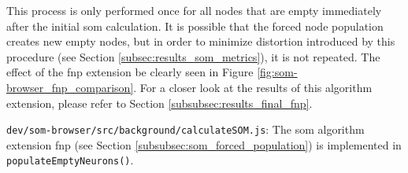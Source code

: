 This process is only performed once for all nodes that are empty immediately
after the initial \gls{som} calculation. It is possible that the forced node
population creates new empty nodes, but in order to minimize distortion
introduced by this procedure (see Section \ref{subsec:results_som_metrics}), it
is not repeated. The effect of the \gls{fnp} extension be clearly seen in Figure
\ref{fig:som-browser_fnp_comparison}. For a closer look at the results of this
algorithm extension, please refer to Section \ref{subsubsec:results_final_fnp}.

\begin{listing}[!htb]
  \caption[FNP implementation]
  {\texttt{dev/som-browser/src/background/calculateSOM.js}: The \gls{som}
  algorithm extension \gls{fnp} (see Section
  \ref{subsubsec:som_forced_population}) is implemented in
  \texttt{populateEmptyNeurons()}.}
  \label{lst:som-browser_fnp}
\end{listing}
